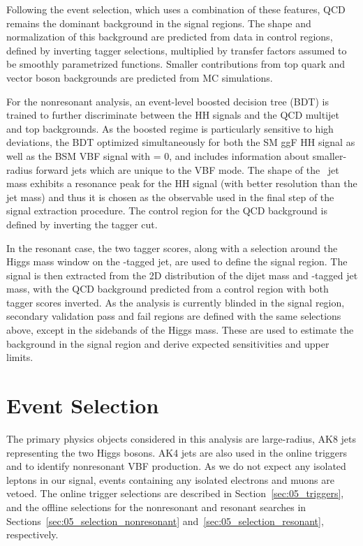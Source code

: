 Following the event selection, which uses a combination of these features, QCD remains the dominant background in the signal regions.
The shape and normalization of this background are predicted from data in control regions, defined by inverting tagger selections, multiplied by transfer factors assumed to be smoothly parametrized functions.
Smaller contributions from top quark and vector boson backgrounds are predicted from MC simulations.

For the nonresonant analysis, an event-level boosted decision tree (BDT) is trained to further discriminate between the HH signals and the QCD multijet and top backgrounds.
As the boosted regime is particularly sensitive to high \kapvv deviations, the BDT optimized simultaneously for both the SM ggF HH signal as well as the BSM VBF signal with \kapvv = 0, and includes information about smaller-radius forward jets which are unique to the VBF mode.
The shape of the \bbbar~jet mass exhibits a resonance peak for the HH signal (with better resolution than the \VV jet mass) and thus it is chosen as the observable used in the final step of the signal extraction procedure.
The control region for the QCD background is defined by inverting the \bbbar tagger cut.

In the resonant case, the two tagger scores, along with a selection around the Higgs mass window on the \bbbar-tagged jet, are used to define the signal region.
The signal is then extracted from the 2D distribution of the dijet mass and \ww-tagged jet mass, with the QCD background predicted from a control region with both tagger scores inverted.
As the analysis is currently blinded in the signal region, secondary validation pass and fail regions are defined with the same selections above, except in the sidebands of the Higgs mass.
These are used to estimate the background in the signal region and derive expected sensitivities and upper limits.


\section{Event Selection}
\label{sec:05_selection}

The primary physics objects considered in this analysis are large-radius, AK8 jets representing the two Higgs bosons.
AK4 jets are also used in the online triggers and to identify nonresonant VBF \HH production.
As we do not expect any isolated leptons in our signal, events containing any isolated electrons and muons are vetoed.
The online trigger selections are described in Section~\ref{sec:05_triggers}, and the offline selections for the nonresonant and resonant searches in Sections~\ref{sec:05_selection_nonresonant} and~\ref{sec:05_selection_resonant}, respectively.

